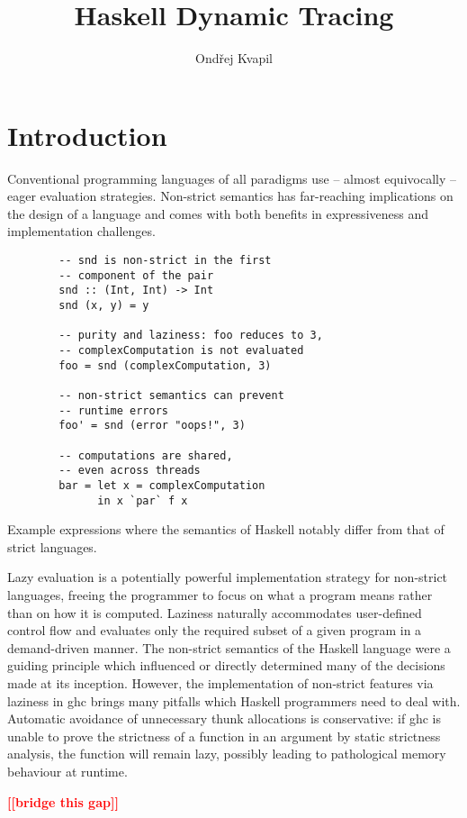\documentclass[thesis=B,english]{FITthesis}[2019/12/23]
\title{Haskell Dynamic Tracing}
\author{Ondřej Kvapil} %
\newcommand{\todo}[1]{\textcolor{red}{\textbf{[[#1]]}}}
\begin{document}
\chapter{Introduction} \label{sec:intro}
Conventional programming languages of all paradigms use -- almost equivocally
-- eager evaluation strategies. Non-strict semantics has far-reaching
implications on the design of a language\cite{haskell-is-pure} and comes with
both benefits in expressiveness and implementation challenges.

\begin{listing}[h]
	\centering
	\begin{verbatim}
		-- snd is non-strict in the first
		-- component of the pair
		snd :: (Int, Int) -> Int
		snd (x, y) = y

		-- purity and laziness: foo reduces to 3,
		-- complexComputation is not evaluated
		foo = snd (complexComputation, 3)

		-- non-strict semantics can prevent
		-- runtime errors
		foo' = snd (error "oops!", 3)

		-- computations are shared,
		-- even across threads
		bar = let x = complexComputation
		      in x `par` f x
	\end{verbatim}
	\caption[Example lazy expressions.]{Example expressions where the semantics
	of Haskell notably differ from that of strict languages.}
	\label{lst:let-x}
\end{listing}

Lazy evaluation is a potentially powerful implementation strategy
for non-strict languages, freeing the programmer to focus on what a program
means rather than on how it is computed. Laziness naturally accommodates
user-defined control flow and evaluates only the required subset of a given
program in a demand-driven manner. The non-strict semantics of the Haskell
language were a guiding principle which influenced or directly determined many
of the decisions made at its inception\cite{history-of-haskell}. However, the
implementation of non-strict features via laziness in \acrshort{ghc} brings
many pitfalls which Haskell programmers need to deal with. Automatic avoidance
of unnecessary thunk allocations is conservative\cite{cmtary-demand-analysis}:
if \acrshort{ghc} is unable to prove the strictness of a function in an
argument by static strictness analysis, the function will remain lazy, possibly
leading to pathological memory behaviour at runtime.

\todo{bridge this gap}
\end{document}

